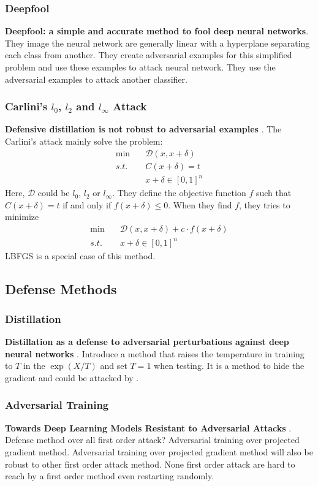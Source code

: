 \documentclass[10pt,a4paper]{article}
\begin{document}
\subsubsection{Deepfool}
\textbf{Deepfool: a simple and accurate method to fool deep neural networks}\cite{madry2017towards}.
They image the neural network are generally linear with a hyperplane separating each class from another. They create adversarial examples for this simplified problem and use these examples to attack neural network. They use the adversarial examples to attack another classifier.
\subsubsection{Carlini's $l_0$, $l_2$ and $l_{\infty}$ Attack}
\textbf{Defensive distillation is not robust to adversarial examples} \cite{carlini2016towards}. The Carlini's attack mainly solve the problem:
\begin{align*}
\min &\quad \mathcal{D}(x,x+\delta)\\
s.t. &\quad C(x+\delta) = t \\
& \quad x+\delta \in [0,1]^n	
\end{align*}
Here, $\mathcal{D}$ could be $l_0$, $l_2$ or $l_{\infty}$. They define the objective function $f$ such that $C(x+\delta)=t$ if and only if $f(x+\delta) \leq 0$. When they find $f$, they tries to minimize 
\begin{align*}
\min & \quad \mathcal{D}(x,x+\delta) +c\cdot f(x+\delta)\\
s.t. & \quad x+\delta \in [0,1]^n	
\end{align*}
LBFGS is a special case of this method.

\subsection{Defense Methods}
\subsubsection{Distillation}
\textbf{Distillation as a defense to adversarial perturbations against deep neural networks} \cite{papernot2016distillation}. Introduce a method that raises the temperature in training to $T$ in the $\exp(X/T)$ and set $T=1$ when testing. It is a method to hide the gradient and could be attacked by \cite{carlini2016towards}.
\subsubsection{Adversarial Training}
\textbf{Towards Deep Learning Models Resistant to Adversarial Attacks} \cite{madry2017towards}.
Defense method over all first order attack? Adversarial training over projected gradient method. Adversarial training over projected gradient method will also be robust to other first order attack method. None first order attack are hard to reach by a first order method even restarting randomly.
\end{document}
